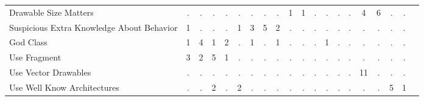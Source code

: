 \begin{table*}[t]
\begin{tabular}{p{4cm}|p{.3cm}p{.3cm}p{.3cm}p{.3cm}p{.3cm}p{.3cm}p{.3cm}p{.3cm}p{.3cm}p{.4cm}p{.4cm}p{.4cm}p{.4cm}p{.4cm}p{.4cm}p{.4cm}p{.4cm}p{.4cm}p{.4cm}}
Drawable Size Matters						& \multicolumn{1}{c}{.}	& \multicolumn{1}{c}{.}	& \multicolumn{1}{c}{.}	& \multicolumn{1}{c}{.}	& \multicolumn{1}{c}{.}	& \multicolumn{1}{c}{.}	& \multicolumn{1}{c}{.}	& \multicolumn{1}{c}{.}	& \multicolumn{1}{c}{1}	& \multicolumn{1}{c}{1}	& \multicolumn{1}{c}{.}	& \multicolumn{1}{c}{.}	& \multicolumn{1}{c}{.}	& \multicolumn{1}{c}{.}	& \multicolumn{1}{c}{4}	& \multicolumn{1}{c}{6}	& \multicolumn{1}{c}{.}	& \multicolumn{1}{c}{.} 		 \\
Suspicious Extra Knowledge About Behavior	& \multicolumn{1}{c}{1}	& \multicolumn{1}{c}{.}	& \multicolumn{1}{c}{.}	& \multicolumn{1}{c}{.}	& \multicolumn{1}{c}{1}	& \multicolumn{1}{c}{3}	& \multicolumn{1}{c}{5}	& \multicolumn{1}{c}{2}	& \multicolumn{1}{c}{.}	& \multicolumn{1}{c}{.}	& \multicolumn{1}{c}{.}	& \multicolumn{1}{c}{.}	& \multicolumn{1}{c}{.}	& \multicolumn{1}{c}{.}	& \multicolumn{1}{c}{.}	& \multicolumn{1}{c}{.}	& \multicolumn{1}{c}{.}	& \multicolumn{1}{c}{.} 		 \\
God Class									& \multicolumn{1}{c}{1}	& \multicolumn{1}{c}{4}	& \multicolumn{1}{c}{1}	& \multicolumn{1}{c}{2}	& \multicolumn{1}{c}{.}	& \multicolumn{1}{c}{1}	& \multicolumn{1}{c}{.}	& \multicolumn{1}{c}{1}	& \multicolumn{1}{c}{.}	& \multicolumn{1}{c}{.}	& \multicolumn{1}{c}{.}	& \multicolumn{1}{c}{1}	& \multicolumn{1}{c}{.}	& \multicolumn{1}{c}{.}	& \multicolumn{1}{c}{.}	& \multicolumn{1}{c}{.}	& \multicolumn{1}{c}{.}	& \multicolumn{1}{c}{.} 		 \\
Use Fragment								& \multicolumn{1}{c}{3}	& \multicolumn{1}{c}{2}	& \multicolumn{1}{c}{5}	& \multicolumn{1}{c}{1}	& \multicolumn{1}{c}{.}	& \multicolumn{1}{c}{.}	& \multicolumn{1}{c}{.}	& \multicolumn{1}{c}{.}	& \multicolumn{1}{c}{.}	& \multicolumn{1}{c}{.}	& \multicolumn{1}{c}{.}	& \multicolumn{1}{c}{.}	& \multicolumn{1}{c}{.}	& \multicolumn{1}{c}{.}	& \multicolumn{1}{c}{.}	& \multicolumn{1}{c}{.}	& \multicolumn{1}{c}{.}	& \multicolumn{1}{c}{.} 		 \\
Use Vector Drawables						& \multicolumn{1}{c}{.}	& \multicolumn{1}{c}{.}	& \multicolumn{1}{c}{.}	& \multicolumn{1}{c}{.}	& \multicolumn{1}{c}{.}	& \multicolumn{1}{c}{.}	& \multicolumn{1}{c}{.}	& \multicolumn{1}{c}{.}	& \multicolumn{1}{c}{.}	& \multicolumn{1}{c}{.}	& \multicolumn{1}{c}{.}	& \multicolumn{1}{c}{.}	& \multicolumn{1}{c}{.}	& \multicolumn{1}{c}{.}	& \multicolumn{1}{c}{11}	& \multicolumn{1}{c}{.}	& \multicolumn{1}{c}{.}	& \multicolumn{1}{c}{.} 	 \\
Use Well Know Architectures					& \multicolumn{1}{c}{.}	& \multicolumn{1}{c}{.}	& \multicolumn{1}{c}{2}	& \multicolumn{1}{c}{.}	& \multicolumn{1}{c}{2}	& \multicolumn{1}{c}{.}	& \multicolumn{1}{c}{.}	& \multicolumn{1}{c}{.}	& \multicolumn{1}{c}{.}	& \multicolumn{1}{c}{.}	& \multicolumn{1}{c}{.}	& \multicolumn{1}{c}{.}	& \multicolumn{1}{c}{.}	& \multicolumn{1}{c}{.}	& \multicolumn{1}{c}{.}	& \multicolumn{1}{c}{.}	& \multicolumn{1}{c}{5}	& \multicolumn{1}{c}{1} 		 \\

\end{tabular}
\end{table*}
